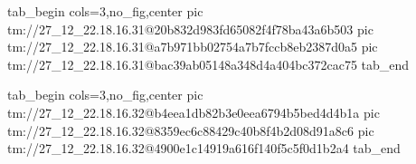  
 
 
 
 

\qqSecOrig


\ifcmt
  tab_begin cols=3,no_fig,center
    pic tm://27_12_22.18.16.31@20b832d983fd65082f4f78ba43a6b503
    pic tm://27_12_22.18.16.31@a7b971bb02754a7b7fccb8eb2387d0a5
    pic tm://27_12_22.18.16.31@bac39ab05148a348d4a404bc372cac75
  tab_end
\fi


\ifcmt
  tab_begin cols=3,no_fig,center
    pic tm://27_12_22.18.16.32@b4eea1db82b3e0eea6794b5bed4d4b1a
    pic tm://27_12_22.18.16.32@8359ec6c88429c40b8f4b2d08d91a8c6
    pic tm://27_12_22.18.16.32@4900e1c14919a616f140f5c5f0d1b2a4
  tab_end
\fi


